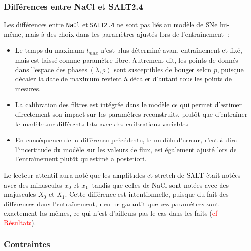 \documentclass{book}
\begin{document}
\subsubsection{Différences entre NaCl et SALT2.4}

Les différences entre \verb|NaCl| et \verb|SALT2.4| ne sont pas liés au modèle de SNe lui-même, mais à des choix dans les paramètres ajustés lors de l'entraînement~:
\begin{itemize}
\item Le temps du maximum $t_{max}$ n'est plus déterminé avant entraînement et fixé, mais est laissé comme paramètre libre. Autrement dit, les points de donnés dans l'espace des phases $(\lambda, p)$ sont susceptibles de bouger selon $p$, puisque décaler la date de maximum revient à décaler d'autant tous les points de mesures.
\item La calibration des filtres est intégrée dans le modèle ce qui permet d'estimer directement son impact sur les paramètres reconstruits, plutôt que d'entraîner le modèle sur différents lots avec des calibrations variables.
\item En conséquence de la différence précédente, le modèle d'erreur, c'est à dire l'incertitude du modèle sur les valeurs de flux, est également ajusté lors de l'entraînement plutôt qu'estimé a posteriori.
\end{itemize}
Le lecteur attentif aura noté que les amplitudes et stretch de SALT était notées avec des minuscules $x_0$ et $x_1$, tandis que celles de NaCl sont notées avec des majuscules $X_0$ et $X_1$. Cette différence est intentionnelle, puisque du fait des différences dans l'entraînement, rien ne garantit que ces paramètres sont exactement les mêmes, ce qui n'est d'ailleurs pas le cas dans les faits (\textcolor{red}{cf Résultats}).


\subsubsection{Contraintes}
\end{document}
